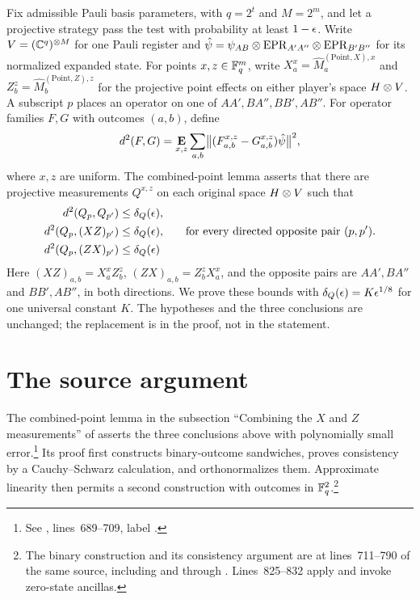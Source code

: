 \documentclass[11pt]{article}
\begin{document}
Fix admissible Pauli basis parameters, with $q=2^t$ and $M=2^m$, and let a
projective strategy pass the test with probability at least $1-\epsilon$.
Write $V=(\mathbb{C}^q)^{\otimes M}$ for one Pauli register and
$\hat\psi=\psi_{AB}\otimes\mathrm{EPR}_{A'A''}\otimes\mathrm{EPR}_{B'B''}$
for its normalized expanded state.  For points $x,z\in\mathbb{F}_q^m$, write
$X_a^x=\hat M^{(\mathrm{Point},X),x}_a$ and
$Z_b^z=\hat M^{(\mathrm{Point},Z),z}_b$ for the projective point effects
on either player's space $H\otimes V$.  A subscript $p$ places an operator on
one of $AA',BA'',BB',AB''$.  For operator families $F,G$ with outcomes $(a,b)$,
define
\[
 d^2(F,G)=\mathop{\bf E\/}_{x,z}\sum_{a,b}
   \bigl\|(F^{x,z}_{a,b}-G^{x,z}_{a,b})\hat\psi\bigr\|^2,
\]
where $x,z$ are uniform.  The combined-point lemma asserts that there are
projective measurements $Q^{x,z}$ on each original space $H\otimes V$ such that
\[
 \begin{aligned}
 d^2(Q_p,Q_{p'})&\leq\delta_Q(\epsilon),\\
 d^2(Q_p,(XZ)_{p'})&\leq\delta_Q(\epsilon),\\
 d^2(Q_p,(ZX)_{p'})&\leq\delta_Q(\epsilon)
 \end{aligned}
 \qquad\text{for every directed opposite pair }(p,p').
\]
Here $(XZ)_{a,b}=X_a^xZ_b^z$, $(ZX)_{a,b}=Z_b^zX_a^x$, and the opposite
pairs are $AA',BA''$ and $BB',AB''$, in both directions.  We prove these
bounds with $\delta_Q(\epsilon)=K\epsilon^{1/8}$ for one universal constant $K$.
The hypotheses and the three conclusions are unchanged; the replacement is
in the proof, not in the statement.

\section{The source argument}

The combined-point lemma in the subsection ``Combining the $X$ and $Z$
measurements'' of \cite{Ji2020MIPStar} asserts the three conclusions above
with polynomially small error.\footnote{See
,
lines~689--709, label .}
Its proof first constructs binary-outcome sandwiches, proves consistency by
a Cauchy--Schwarz calculation, and orthonormalizes them.  Approximate
linearity then permits a second construction with outcomes in
$\mathbb{F}_q^2$.\footnote{The binary construction and its consistency argument are
at lines~711--790 of the same source, including  and
 through .
Lines~825--832 apply  and invoke zero-state ancillas.}
\end{document}
